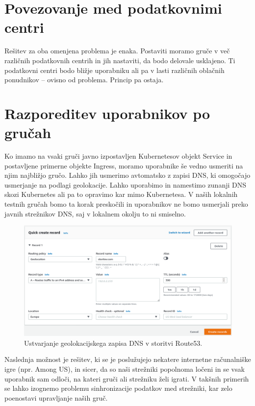 \documentclass[a4paper, 12pt]{book}
\begin{document}
\section{Povezovanje med podatkovnimi centri}
Rešitev za oba omenjena problema je enaka.
Postaviti moramo gruče v več različnih podatkovnih centrih in jih nastaviti, da bodo delovale usklajeno.
Ti podatkovni centri bodo bližje uporabniku ali pa v lasti različnih oblačnih ponudnikov -- ovisno od problema.
  Princip pa ostaja.
\section{Razporeditev uporabnikov po gručah}
Ko imamo na vsaki gruči javno izpostavljen Kubernetesov objekt Service in postavljene primerne objekte Ingress, moramo uporabnike še vedno usmeriti na njim najbližjo gručo.
Lahko jih usmerimo avtomatsko z zapisi DNS, ki omogočajo usmerjanje na podlagi geolokacije.
Lahko uporabimo in namestimo zunanji DNS skozi Kubernetes ali pa to opravimo kar mimo Kubernetesa.
V naših lokalnih testnih gručah bomo ta korak preskočili in uporabnikov ne bomo usmerjali preko javnih strežnikov DNS, saj v lokalnem okolju to ni smiselno.
\begin{figure}[h]
\begin{center}
\includegraphics[width=1.0\textwidth]{images/geolokacijski-dns.png}
\end{center}
  \caption{Ustvarjanje geolokacijskega zapisa DNS v storitvi Route53.}
\label{primer-ustvarjanje-geolokacijskega-zapisa}
\end{figure}

Naslednja možnost je rešitev, ki se je poslužujejo nekatere internetne računalniške igre (npr. Among US), in sicer, da so naši strežniki popolnoma ločeni in se vsak uporabnik sam odloči, na kateri gruči ali strežniku želi igrati.
V takšnih primerih se lahko izognemo problemu sinhronizacije podatkov med strežniki, kar zelo poenostavi upravljanje naših gruč.
\end{document}
